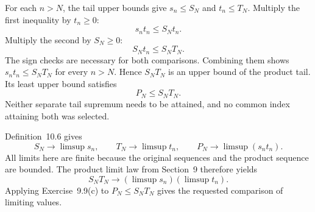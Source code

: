 For each $n>N$, the tail upper bounds give $s_n\le S_N$ and
$t_n\le T_N$. Multiply the first inequality by $t_n\ge0$:
\[
 s_nt_n\le S_Nt_n.
\]
Multiply the second by $S_N\ge0$:
\[
 S_Nt_n\le S_NT_N.
\]
The sign checks are necessary for both comparisons. Combining them
shows $s_nt_n\le S_NT_N$ for every $n>N$.
Hence $S_NT_N$ is an upper bound of the product tail. Its least
upper bound satisfies
\[
 P_N\le S_NT_N.
\]
Neither separate tail supremum needs to be attained, and no common
index attaining both was selected.

Definition~10.6 gives
\[
 S_N\to\limsup s_n,\qquad T_N\to\limsup t_n,
 \qquad P_N\to\limsup(s_nt_n).
\]
All limits here are finite because the original sequences and the
product sequence are bounded. The product limit law from Section~9
therefore yields
\[
 S_NT_N\longrightarrow(\limsup s_n)(\limsup t_n).
\]
Applying Exercise~9.9(c) to $P_N\le S_NT_N$ gives the requested
comparison of limiting values.

